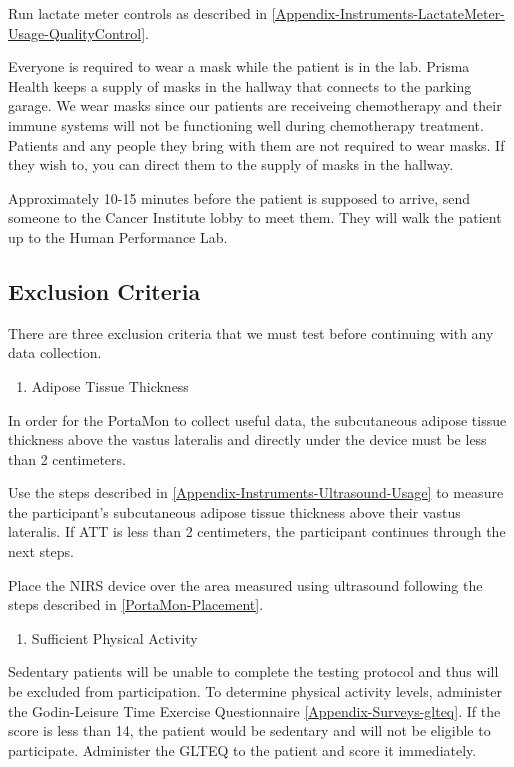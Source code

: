 \documentclass[
]{book}
\providecommand{\tightlist}{%
  \setlength{\itemsep}{0pt}\setlength{\parskip}{0pt}}
\begin{document}
Run lactate meter controls as described in \ref{Appendix-Instruments-LactateMeter-Usage-QualityControl}.

Everyone is required to wear a mask while the patient is in the lab. Prisma Health keeps a supply of masks in the hallway that connects to the parking garage. We wear masks since our patients are receiveing chemotherapy and their immune systems will not be functioning well during chemotherapy treatment. Patients and any people they bring with them are not required to wear masks. If they wish to, you can direct them to the supply of masks in the hallway.

Approximately 10-15 minutes before the patient is supposed to arrive, send someone to the Cancer Institute lobby to meet them. They will walk the patient up to the Human Performance Lab.

\hypertarget{Methods-LT-ExclusionCriteria}{%
\subsection{Exclusion Criteria}\label{Methods-LT-ExclusionCriteria}}

There are three exclusion criteria that we must test before continuing with any data collection.

\begin{enumerate}
\def\labelenumi{\arabic{enumi}.}
\tightlist
\item
  Adipose Tissue Thickness
\end{enumerate}

In order for the PortaMon to collect useful data, the subcutaneous adipose tissue thickness above the vastus lateralis and directly under the device must be less than 2 centimeters.

Use the steps described in \ref{Appendix-Instruments-Ultrasound-Usage} to measure the participant's subcutaneous adipose tissue thickness above their vastus lateralis. If ATT is less than 2 centimeters, the participant continues through the next steps.

Place the NIRS device over the area measured using ultrasound following the steps described in \ref{PortaMon-Placement}.

\begin{enumerate}
\def\labelenumi{\arabic{enumi}.}
\setcounter{enumi}{1}
\tightlist
\item
  Sufficient Physical Activity
\end{enumerate}

Sedentary patients will be unable to complete the testing protocol and thus will be excluded from participation. To determine physical activity levels, administer the Godin-Leisure Time Exercise Questionnaire \ref{Appendix-Surveys-glteq}. If the score is less than 14, the patient would be sedentary and will not be eligible to participate. Administer the GLTEQ to the patient and score it immediately.
\end{document}
